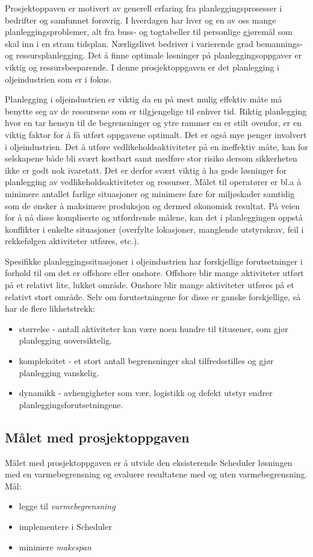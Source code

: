 Prosjektoppaven er motivert av generell erfaring fra planleggingsprosesser i bedrifter og samfunnet forøvrig. I hverdagen har hver og en av oss mange planleggingsproblemer, alt fra buss- og togtabeller til personlige gjøremål som skal inn i en stram tidsplan. Nærligslivet  bedriver i varierende grad bemannings- og ressursplanlegging. Det å finne optimale løsninger på planleggingsoppgaver er viktig og ressursbesparende. I denne prosjektoppgaven er det planlegging i oljeindustrien som er i fokus.

Planlegging i oljeindustrien er viktig da en på mest mulig effektiv måte må benytte seg av de ressursene som er tilgjengelige til enhver tid. Riktig planlegging hvor en tar hensyn til de begrensninger og ytre rammer en er stilt ovenfor, er en viktig faktor for å få utført oppgavene optimalt. Det er også mye penger involvert i oljeindustrien. Det å utføre vedlikeholdsaktiviteter på en ineffektiv måte, kan for selskapene både bli svært kostbart samt medføre stor risiko dersom sikkerheten ikke er godt nok ivaretatt. Det er derfor svært viktig å ha gode løsninger for planlegging av vedlikeholdsaktiviteter og ressurser. Målet til operatører er bl.a å minimere antallet farlige situasjoner og minimere fare for miljøskader samtidig som de ønsker å maksimere produksjon og dermed økonomisk resultat. På veien for å nå disse kompliserte og utfordrende målene, kan det i planleggingen oppstå konflikter i enkelte situasjoner (overfylte lokasjoner, manglende utstyrskrav, feil i rekkefølgen aktiviteter utføres, etc.).

Spesifikke planleggingssituasjoner i oljeindustrien har forskjellige forutsetninger i forhold til om det er offshore eller onshore. Offshore blir mange aktiviteter utført på et relativt lite, lukket område. Onshore blir mange aktiviteter utføres på et relativt stort område. Selv om forutsetningene for disse er ganske forskjellige, så har de flere likhetstrekk:
\begin{itemize}
\item størrelse - antall aktiviteter kan være noen hundre til titusener, som gjør planlegging uoversiktelig.
\item kompleksitet - et stort antall begrensninger skal tilfredsstilles og gjør planlegging vanskelig.
\item dynamikk - avhengigheter som vær, logistikk og defekt utstyr endrer planleggingsforutsetningene.
\end{itemize}

\subsection{Målet med prosjektoppgaven}
Målet med prosjektoppgaven er å utvide den eksisterende Scheduler løsningen med en varmebegrensning og evaluere resultatene med og uten varmebegrensning. Mål:
\begin{itemize}
\item legge til \textit{varmebegrensning}
\item implementere i Scheduler
\item minimere \textit{makespan}
\end{itemize}

